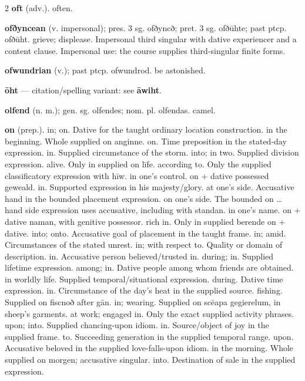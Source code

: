 \begin{multicols*}{2}
\textbf{oft} (adv.). often.\par
\textbf{ofðyncean} (v. impersonal); pres. 3 sg. ofðyncð; pret. 3 sg. ofðūhte; past ptcp. ofðūht. grieve; displease. Impersonal third singular with dative experiencer and a content clause. Impersonal use: the course supplies third-singular finite forms.\par
\textbf{ofwundrian} (v.); past ptcp. ofwundrod. be astonished.\par
\textbf{ōht} — citation/spelling variant: see \textbf{āwiht}.\par
\textbf{olfend} (n. m.); gen. sg. olfendes; nom. pl. olfendas. camel.\par
\textbf{on} (prep.). in; on. Dative for the taught ordinary location construction. in the beginning. Whole supplied on anginne. on. Time preposition in the stated-day expression. in. Supplied circumstance of the storm. into; in two. Supplied division expression. alive. Only in supplied on līfe. according to. Only the supplied classificatory expression with hīw. in one's control. on + dative possessed geweald. in. Supported expression in his majesty/glory. at one's side. Accusative hand in the bounded placement expression. on one's side. The bounded on … hand side expression uses accusative, including with standan. in one's name. on + dative naman, with genitive possessor. rich in. Only in supplied berende on + dative. into; onto. Accusative goal of placement in the taught frame. in; amid. Circumstances of the stated unrest. in; with respect to. Quality or domain of description. in. Accusative person believed/trusted in. during; in. Supplied lifetime expression. among; in. Dative people among whom friends are obtained. in worldly life. Supplied temporal/situational expression. during. Dative time expression. in. Circumstance of the day's heat in the supplied source. fishing. Supplied on fiscnoð after gān. in; wearing. Supplied on scēapa gegierelum, in sheep's garments. at work; engaged in. Only the exact supplied activity phrases. upon; into. Supplied chancing-upon idiom. in. Source/object of joy in the supplied frame. to. Succeeding generation in the supplied temporal range. upon. Accusative beloved in the supplied love-falls-upon idiom. in the morning. Whole supplied on morgen; accusative singular. into. Destination of sale in the supplied expression.\par

\end{multicols*}
